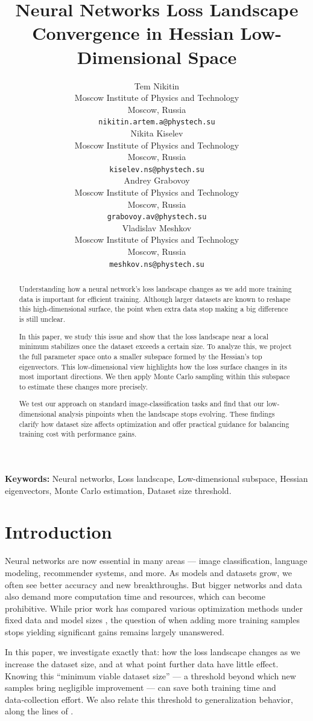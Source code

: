 \documentclass{article}
\title{Neural Networks Loss Landscape Convergence in Hessian Low-Dimensional Space}
\author{
  Tem Nikitin\\
  Moscow Institute of Physics and Technology\\
  Moscow, Russia\\
  \texttt{nikitin.artem.a@phystech.su}\\
  \And
  Nikita Kiselev\\
  Moscow Institute of Physics and Technology\\
  Moscow, Russia\\
  \texttt{kiselev.ns@phystech.su}\\
  \And
  Andrey Grabovoy\\
  Moscow Institute of Physics and Technology\\
  Moscow, Russia\\
  \texttt{grabovoy.av@phystech.su}\\
  \And
  Vladislav Meshkov\\
  Moscow Institute of Physics and Technology\\
  Moscow, Russia\\
  \texttt{meshkov.ns@phystech.su}\\
}
\begin{document}
\maketitle


\begin{abstract}
  Understanding how a neural network’s loss landscape changes as we add more training data is important for efficient training.
  Although larger datasets are known to reshape this high-dimensional surface, the point when extra data stop making a big difference
  is still unclear.

  In this paper, we study this issue and show that the loss landscape near a local minimum stabilizes once the dataset exceeds a
  certain size. To analyze this, we project the full parameter space onto a smaller subspace formed by the Hessian’s top eigenvectors.
  This low-dimensional view highlights how the loss surface changes in its most important directions. We then apply Monte Carlo sampling
  within this subspace to estimate these changes more precisely.

  We test our approach on standard image‑classification tasks and find that our low-dimensional analysis pinpoints when the landscape
  stops evolving. These findings clarify how dataset size affects optimization and offer practical guidance for balancing training cost
  with performance gains.
\end{abstract}


\textbf{Keywords:}
Neural networks, Loss landscape, Low-dimensional subspace, Hessian eigenvectors, Monte Carlo estimation, Dataset size threshold.


\section{Introduction}\label{sec:intro}

Neural networks are now essential in many areas --- image classification, language modeling, recommender systems, and more. As models and
datasets grow, we often see better accuracy and new breakthroughs. But bigger networks and data also demand more computation time and
resources, which can become prohibitive. While prior work has compared various optimization methods under fixed data and model sizes
\cite{soydaner2020comparison}, the question of when adding more training samples stops yielding significant gains remains largely
unanswered.

In this paper, we investigate exactly that: how the loss landscape changes as we increase the dataset size, and at what point further
data have little effect. Knowing this “minimum viable dataset size” --- a threshold beyond which new samples bring negligible
improvement --- can save both training time and data‑collection effort. We also relate this threshold to generalization behavior, along
the lines of \cite{wu2017towards}.
\end{document}
